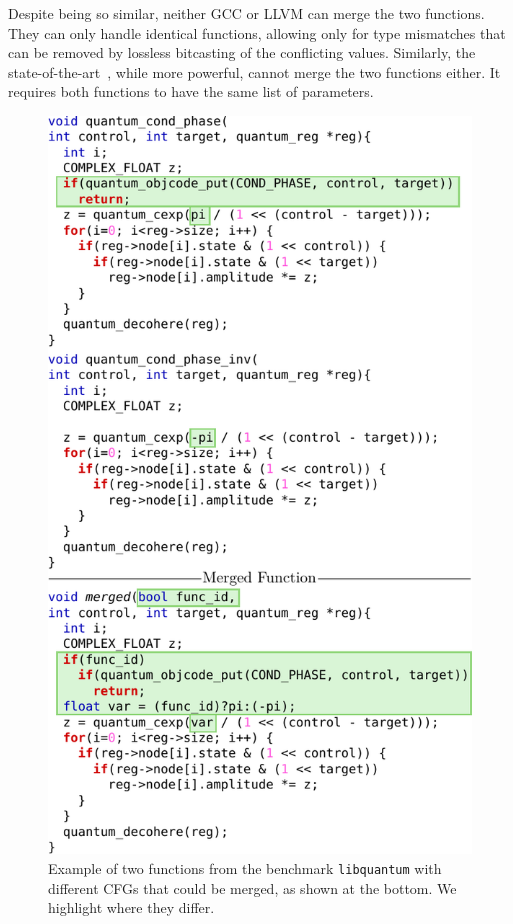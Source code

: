 Despite being so similar, neither GCC or LLVM can merge the two functions.
They can only handle identical functions, allowing only for type mismatches
that can be removed by lossless bitcasting of the conflicting values.
Similarly, the state-of-the-art~\cite{edler14}, while more powerful, cannot
merge the two functions either. It requires both functions to have the same list
of parameters.

\begin{figure}[t!]
  \centering
  \includegraphics[width=\linewidth]{figs/libquantum-example.pdf}
    \caption{Example of two functions from the benchmark \texttt{libquantum}
	  with different CFGs that could be merged, as shown at the bottom.
      We highlight where they differ.}
  \label{fig:libquantum-example}
\end{figure}

